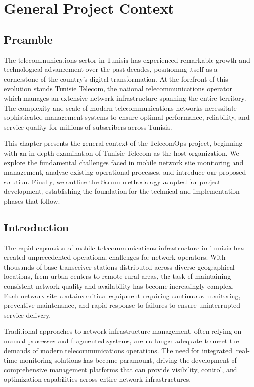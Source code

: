 \chapter{General Project Context}

\section*{Preamble}

The telecommunications sector in Tunisia has experienced remarkable growth and technological advancement over the past decades, positioning itself as a cornerstone of the country's digital transformation. At the forefront of this evolution stands Tunisie Telecom, the national telecommunications operator, which manages an extensive network infrastructure spanning the entire territory. The complexity and scale of modern telecommunications networks necessitate sophisticated management systems to ensure optimal performance, reliability, and service quality for millions of subscribers across Tunisia.

This chapter presents the general context of the TelecomOps project, beginning with an in-depth examination of Tunisie Telecom as the host organization. We explore the fundamental challenges faced in mobile network site monitoring and management, analyze existing operational processes, and introduce our proposed solution. Finally, we outline the Scrum methodology adopted for project development, establishing the foundation for the technical and implementation phases that follow.

\section{Introduction}

The rapid expansion of mobile telecommunications infrastructure in Tunisia has created unprecedented operational challenges for network operators. With thousands of base transceiver stations distributed across diverse geographical locations, from urban centers to remote rural areas, the task of maintaining consistent network quality and availability has become increasingly complex. Each network site contains critical equipment requiring continuous monitoring, preventive maintenance, and rapid response to failures to ensure uninterrupted service delivery.

Traditional approaches to network infrastructure management, often relying on manual processes and fragmented systems, are no longer adequate to meet the demands of modern telecommunications operations. The need for integrated, real-time monitoring solutions has become paramount, driving the development of comprehensive management platforms that can provide visibility, control, and optimization capabilities across entire network infrastructures.

